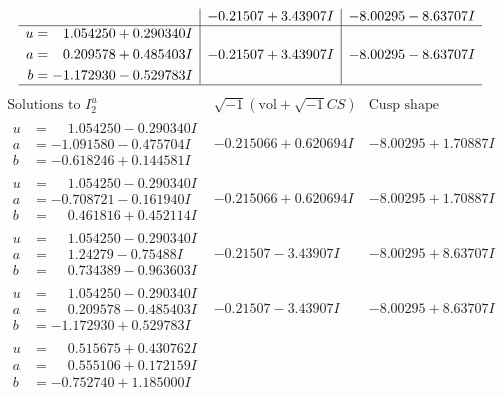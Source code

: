 \documentclass[1p]{elsarticle_modified}
\theoremstyle{definition}
\newcommand{\I}{\sqrt{-1}}
\begin{document}
$$\begin{array}{c|c|c}
 & -0.21507 + 3.43907 I & -8.00295 - 8.63707 I \\ \hline\begin{aligned}
u &= \phantom{-}1.054250 + 0.290340 I \\
a &= \phantom{-}0.209578 + 0.485403 I \\
b &= -1.172930 - 0.529783 I\end{aligned}
 & -0.21507 + 3.43907 I & -8.00295 - 8.63707 I\\
 \hline 
 \end{array}$$\newpage$$\begin{array}{c|c|c}  
\text{Solutions to }I^u_{2}& \I (\text{vol} + \sqrt{-1}CS) & \text{Cusp shape}\\
 \hline 
\begin{aligned}
u &= \phantom{-}1.054250 - 0.290340 I \\
a &= -1.091580 - 0.475704 I \\
b &= -0.618246 + 0.144581 I\end{aligned}
 & -0.215066 + 0.620694 I & -8.00295 + 1.70887 I \\ \hline\begin{aligned}
u &= \phantom{-}1.054250 - 0.290340 I \\
a &= -0.708721 - 0.161940 I \\
b &= \phantom{-}0.461816 + 0.452114 I\end{aligned}
 & -0.215066 + 0.620694 I & -8.00295 + 1.70887 I \\ \hline\begin{aligned}
u &= \phantom{-}1.054250 - 0.290340 I \\
a &= \phantom{-}1.24279 - 0.75488 I \\
b &= \phantom{-}0.734389 - 0.963603 I\end{aligned}
 & -0.21507 - 3.43907 I & -8.00295 + 8.63707 I \\ \hline\begin{aligned}
u &= \phantom{-}1.054250 - 0.290340 I \\
a &= \phantom{-}0.209578 - 0.485403 I \\
b &= -1.172930 + 0.529783 I\end{aligned}
 & -0.21507 - 3.43907 I & -8.00295 + 8.63707 I \\ \hline\begin{aligned}
u &= \phantom{-}0.515675 + 0.430762 I \\
a &= \phantom{-}0.555106 + 0.172159 I \\
b &= -0.752740 + 1.185000 I\end{aligned}

\end{array}$$
\end{document}
